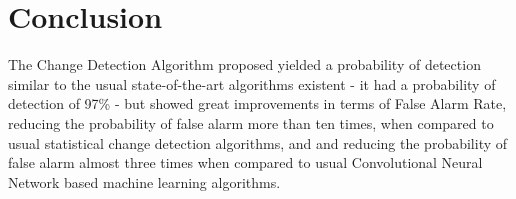 \section{Conclusion}
The Change Detection Algorithm proposed yielded a probability of detection similar to the usual state-of-the-art algorithms existent - it had a probability of detection of 97\% - 
but showed great improvements in terms of False Alarm Rate, reducing the probability of false alarm more than ten times, when compared to usual statistical change detection algorithms, and 
and reducing the probability of false alarm almost three times when compared to usual Convolutional Neural Network based machine learning algorithms.

